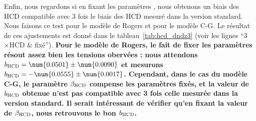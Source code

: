 Enfin, nous regardons si en fixant les paramètres \lya{}, nous obtenons un biais des HCD compatible avec 3 fois le biais des HCD mesuré dans la version standard. Nous faisons ce test pour le modèle de Rogers et pour le modèle C-G. Le résultat de ces ajustements est donné dans le tableau~\ref{tab:hcd_dndz3} (voir les lignes ``3$\times$HCD \& \lya{} fixé'').
\textbf{Pour le modèle de Rogers, le fait de fixer les paramètres \lya{} résout assez bien les tensions obervées : nous attendons $b_{\textsc{HCD}} = \num{0.0501} \pm \num{0.0090}$ et mesurons $b_{\textsc{HCD}} = -\num{0.0555} \pm \num{0.0017}$.
  Cependant, dans le cas du modèle C-G, le paramètre $\beta_{\textsc{HCD}}$ compense les paramètres \lya{} fixés, et la valeur de $b_{\textsc{HCD}}$ obtenue n'est pas compatible avec 3 fois celle mesurée dans la version standard.
  Il serait intéressant de vérifier qu'en fixant la valeur de $\beta_{\textsc{HCD}}$, nous retrouvons le bon $b_{\textsc{HCD}}$.}

